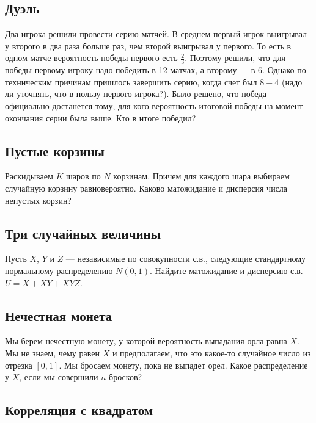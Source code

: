 \documentclass[12pt]{article}
\begin{document}
\subsection{Дуэль}

Два игрока решили провести серию матчей. В среднем первый игрок выигрывал у второго в два раза больше раз, чем второй выигрывал у первого. То есть в одном матче вероятность победы первого есть $\frac{2}{3}$. Поэтому решили, что для победы первому игроку надо победить в 12 матчах, а второму --- в 6. Однако по техническим причинам пришлось завершить серию, когда счет был $8-4$ (надо ли уточнять, что в пользу первого игрока?). Было решено, что победа официально достанется тому, для кого вероятность итоговой победы на момент окончания серии была выше. Кто в итоге победил?



\subsection{Пустые корзины}

Раскидываем $K$ шаров по $N$ корзинам. Причем для каждого шара выбираем случайную корзину равновероятно. Каково матожидание и дисперсия числа непустых корзин?



\subsection{Три случайных величины}

Пусть $X$, $Y$ и $Z$ --- независимые по совокупности с.в., следующие стандартному нормальному распределению $N(0, 1)$. Найдите матожидание и дисперсию с.в. $U = X + XY + XYZ$. 



\subsection{Нечестная монета}

Мы берем нечестную монету, у которой вероятность выпадания орла равна $X$. Мы не знаем, чему равен $X$ и предполагаем, что это какое-то случайное число из отрезка $[0, 1]$. Мы бросаем монету, пока не выпадет орел. Какое распределение у $X$, если мы совершили $n$ бросков?



\subsection{Корреляция с квадратом}
\end{document}
